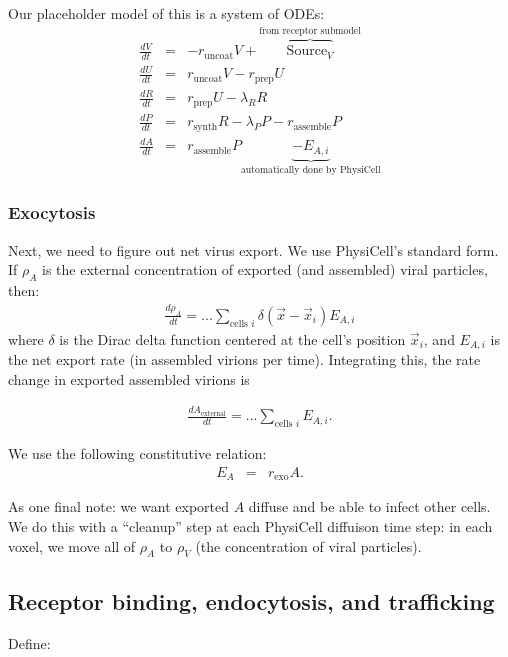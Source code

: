 \documentclass[12point]{article}
\begin{document}
Our placeholder model of this is a system of ODEs: 
\begin{eqnarray}
\frac{dV}{dt} & = & -r_\textrm{uncoat} V  + \overbrace{ \textrm{Source}_V }^\textrm{from receptor submodel} \\
\frac{dU}{dt} & = & r_\textrm{uncoat} V - r_\textrm{prep} U \\
\frac{dR}{dt} & = & r_\textrm{prep} U - \lambda_R R \\
\frac{dP}{dt} & = & r_\textrm{synth} R - \lambda_P P - r_\textrm{assemble} P \\
\frac{dA}{dt} & = & r_\textrm{assemble} P \underbrace{- E_{A,i} }_{\textrm{automatically done by PhysiCell}}
\end{eqnarray}

\subsubsection{Exocytosis} 
Next, we need to figure out net virus export. We use PhysiCell's standard form. If $\rho_A$ is the external concentration of exported (and assembled) viral particles, then: 
\begin{eqnarray}
\frac{d\rho_A}{dt} = ... \sum_{\textrm{cells } i} \delta( \vec{x}-\vec{x}_i ) E_{A,i}
\end{eqnarray}
where $\delta$ is the Dirac delta function centered at the cell's position
$\vec{x}_i$, and $E_{A,i}$ is the net export rate (in assembled virions per time). Integrating this, 
the rate change in exported assembled virions is

\begin{eqnarray}
\frac{dA_\textrm{external}}{dt} = ... \sum_{\textrm{cells } i} E_{A,i}.
\end{eqnarray}


We use the following constitutive relation: 
\begin{eqnarray}
E_A & = & r_\textrm{exo} A. 
\end{eqnarray}

As one final note: we want exported $A$ diffuse and be able to infect other cells. We do this with a ``cleanup'' step at each PhysiCell diffuison time step: in each voxel, we move all of $\rho_A$ to $\rho_V$ (the concentration 
of viral particles). 



\subsection{Receptor binding, endocytosis, and trafficking}
Define: \\
\end{document}
